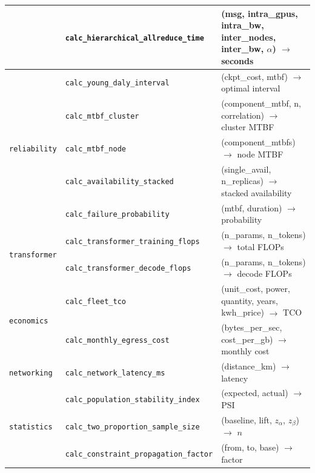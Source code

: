\documentclass[10pt,twocolumn]{article}
\begin{document}
\begin{table}[!t]
\begin{tabularx}{\textwidth}{@{}l l X@{}}
 & \texttt{calc\_hierarchical\_allreduce\_time} & (msg, intra\_gpus, intra\_bw, inter\_nodes, inter\_bw, $\alpha$) $\to$ seconds \\
\midrule
\multirow{5}{*}{\texttt{reliability}} & \texttt{calc\_young\_daly\_interval} & (ckpt\_cost, mtbf) $\to$ optimal interval \\
 & \texttt{calc\_mtbf\_cluster} & (component\_mtbf, n, correlation) $\to$ cluster MTBF \\
 & \texttt{calc\_mtbf\_node} & (component\_mtbfs) $\to$ node MTBF \\
 & \texttt{calc\_availability\_stacked} & (single\_avail, n\_replicas) $\to$ stacked availability \\
 & \texttt{calc\_failure\_probability} & (mtbf, duration) $\to$ probability \\
\midrule
\multirow{2}{*}{\texttt{transformer}} & \texttt{calc\_transformer\_training\_flops} & (n\_params, n\_tokens) $\to$ total FLOPs \\
 & \texttt{calc\_transformer\_decode\_flops} & (n\_params, n\_tokens) $\to$ decode FLOPs \\
\midrule
\multirow{2}{*}{\texttt{economics}} & \texttt{calc\_fleet\_tco} & (unit\_cost, power, quantity, years, kwh\_price) $\to$ TCO \\
 & \texttt{calc\_monthly\_egress\_cost} & (bytes\_per\_sec, cost\_per\_gb) $\to$ monthly cost \\
\midrule
\texttt{networking} & \texttt{calc\_network\_latency\_ms} & (distance\_km) $\to$ latency \\
\midrule
\multirow{3}{*}{\texttt{statistics}} & \texttt{calc\_population\_stability\_index} & (expected, actual) $\to$ PSI \\
 & \texttt{calc\_two\_proportion\_sample\_size} & (baseline, lift, $z_\alpha$, $z_\beta$) $\to$ $n$ \\
 & \texttt{calc\_constraint\_propagation\_factor} & (from, to, base) $\to$ factor \\
\bottomrule
\end{tabularx}
\end{table}
\end{document}
